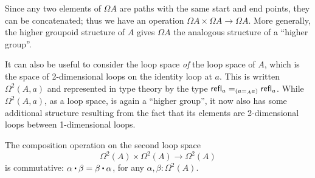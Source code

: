 Since any two elements of $\Omega A$ are paths with the same start and end points, they can be concatenated; thus we have an operation $\Omega A\times \Omega A\to \Omega A$. More generally, the higher groupoid structure of $A$ gives $\Omega A$ the analogous structure of a ``higher group''. 

It can also be useful to consider the loop space \emph{of} the loop space of $A$, which is the space of 2-dimensional loops on the identity loop at $a$. This is written $\Omega^2(A,a)$ and represented in type theory by the type $\id[({\id[A]{a}{a}})]{\refl{a}}{\refl{a}}$. While $\Omega^2(A,a)$, as a loop space, is again a ``higher group'', it now also has some additional structure resulting from the fact that its elements are 2-dimensional loops between 1-dimensional loops. 

\begin{thm}\label{thm:EckmannHilton}
The composition operation on the second loop space
%
\begin{equation*}
\Omega^2(A)\times \Omega^2(A)\to \Omega^2(A)
\end{equation*}
is commutative: $\alpha\ct\beta = \beta\ct\alpha$, for any $\alpha, \beta:\Omega^2(A)$.
%
\end{thm}

